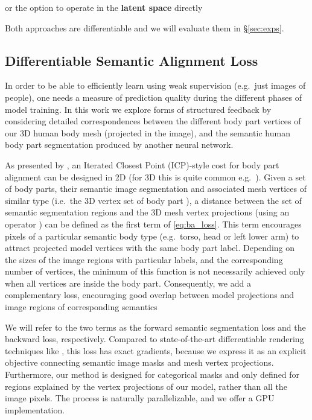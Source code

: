 \documentclass[runningheads]{llncs}
\newcommand{\eg}{e.g.\ }
\newcommand{\ie}{i.e.\ }
\begin{document}
or the option to operate in the \textbf{latent space} directly

Both approaches are differentiable and we will evaluate them in \S\ref{sec:exps}.


\subsection{Differentiable Semantic Alignment Loss}

In order to be able to efficiently learn using weak supervision (\eg just images of people), one needs a measure of prediction quality during the different phases of model training. 
In this work we explore forms of structured feedback by considering detailed correspondences between the different body part vertices of our 3D human body mesh (projected in the image), and the semantic human body part segmentation produced by another neural network. 

As presented by \cite{zanfir2018monocular}, an Iterated Closest Point (ICP)-style cost for body part alignment can be designed in 2D (for 3D this is quite common \eg  \cite{zhang2017detailed}). Given a set of  body parts, their semantic image segmentation  and associated mesh vertices of similar type  (\ie the 3D vertex set of body part ), a distance between the set of semantic segmentation regions and the 3D mesh vertex projections (using an operator ) can be defined as the first term of \eqref{eq:ba_loss}.
This term encourages pixels of a particular semantic body type (\eg torso, head or left lower arm) to attract projected model vertices with the same body part label. Depending on the sizes of the image regions with particular labels, and the corresponding number of vertices, the minimum of this function is not necessarily achieved only when all vertices are inside the body part. Consequently, we add a complementary loss, encouraging good overlap between  model projections and image regions of corresponding semantics 

We will refer to the two terms as the forward semantic segmentation loss and the backward loss, respectively. Compared to state-of-the-art differentiable rendering techniques like \cite{kato2018neural}, this loss has exact gradients, because we express it as an explicit objective connecting semantic image masks and mesh vertex projections. Furthermore, our method is designed for categorical masks and only defined for regions explained by the vertex projections of our model, rather than all the image pixels.
The process is naturally parallelizable, and we offer a GPU implementation.
\end{document}
